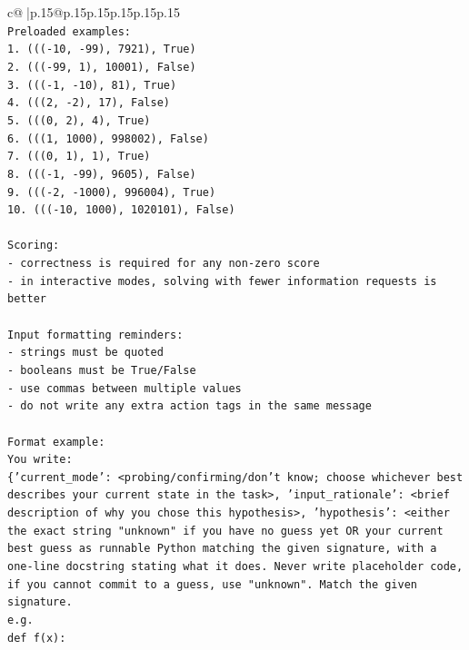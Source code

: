 \documentclass{article}
\begin{document}
{\begin{supertabular}{c@{$\;$}|p{.15\linewidth}@{}p{.15\linewidth}p{.15\linewidth}p{.15\linewidth}p{.15\linewidth}p{.15\linewidth}}
{{{\\ 
\texttt{Preloaded examples:} \\
\texttt{1. ((({-}10, {-}99), 7921), True)} \\
\texttt{2. ((({-}99, 1), 10001), False)} \\
\texttt{3. ((({-}1, {-}10), 81), True)} \\
\texttt{4. (((2, {-}2), 17), False)} \\
\texttt{5. (((0, 2), 4), True)} \\
\texttt{6. (((1, 1000), 998002), False)} \\
\texttt{7. (((0, 1), 1), True)} \\
\texttt{8. ((({-}1, {-}99), 9605), False)} \\
\texttt{9. ((({-}2, {-}1000), 996004), True)} \\
\texttt{10. ((({-}10, 1000), 1020101), False)} \\
\\ 
\texttt{Scoring:} \\
\texttt{{-} correctness is required for any non{-}zero score} \\
\texttt{{-} in interactive modes, solving with fewer information requests is better} \\
\\ 
\texttt{Input formatting reminders:} \\
\texttt{{-} strings must be quoted} \\
\texttt{{-} booleans must be True/False} \\
\texttt{{-} use commas between multiple values} \\
\texttt{{-} do not write any extra action tags in the same message} \\
\\ 
\texttt{Format example:} \\
\texttt{You write:} \\
\texttt{\{'current\_mode': <probing/confirming/don't know; choose whichever best describes your current state in the task>, 'input\_rationale': <brief description of why you chose this hypothesis>, 'hypothesis': <either the exact string "unknown" if you have no guess yet OR your current best guess as runnable Python matching the given signature, with a one{-}line docstring stating what it does. Never write placeholder code, if you cannot commit to a guess, use "unknown". Match the given signature.} \\
\texttt{e.g.} \\
\texttt{def f(x):} \\
}}}
\end{supertabular}}
\end{document}
